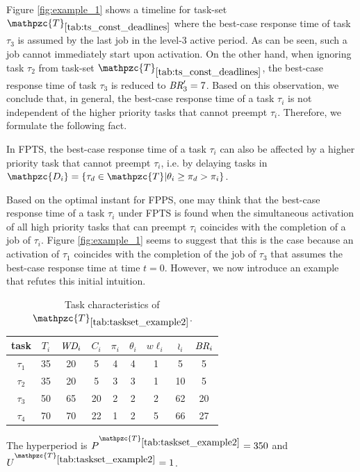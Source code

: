 Figure \ref{fig:example_1} shows a timeline for task-set $\mathpzc{T}_{\ref{tab:ts_const_deadlines}}$ where the best-case response time of task $\tau_3$ is assumed by the last job in the level-3 active period. As can be seen, such a job cannot immediately start upon activation. On the other hand, when ignoring task $\tau_2$ from task-set $\mathpzc{T}_{\ref{tab:ts_const_deadlines}}$, the best-case response time of task $\tau_3$ is reduced to $\mbox{\it BR}^{\prime}_3 = 7$. Based on this observation, we conclude that, in general, the best-case response time of a task $\tau_i$ is not independent of the higher priority tasks that cannot preempt $\tau_i$. Therefore, we formulate the following fact.

\begin{fact} \label{fct:delaying_tasks}
	In FPTS, the best-case response time of a task $\tau_i$ can also be affected by a higher priority task that cannot preempt $\tau_i$, i.e. by delaying tasks in $\mathpzc{D_i}=\{\tau_d \in \mathpzc{T}|\theta_i \geq \pi_d > \pi_i\}$.
\end{fact}


Based on the optimal instant for FPPS, one may think that the best-case response time of a task $\tau_i$ under FPTS is found when the simultaneous activation of all high priority tasks that can preempt $\tau_i$ coincides with the completion of a job of $\tau_i$. Figure \ref{fig:example_1} seems to suggest that this is the case because an activation of $\tau_1$ coincides with the completion of the job of $\tau_3$ that assumes the best-case response time at time $t=0$. However, we now introduce an example that refutes this initial intuition.

\begin{table}[h]
	\center
	\caption{Task characteristics of $\mathpzc{T}_{\ref{tab:taskset_example2}}$.}
	\label{tab:taskset_example2}
	\begin{tabular}{c | c c c c c | c c c}
		\hline 
		task & $T_i$ & $\mbox{\it WD}_i$ & $C_i$ & $\pi_i$ & $\theta_i$ & $w\ell_i$ & $\wr_i$ & $\mbox{\it BR}_i$\\ 
		\hline 
		$\tau_1$& 35 & 20 & 5  & 4 & 4 & 1 &5 & 5\\ 
		$\tau_2$& 35 & 20 & 5  & 3 & 3 & 1 &10 & 5\\
		$\tau_3$& 50 & 65 & 20 & 2 & 2 & 2 &62 & 20\\ 
		$\tau_4$& 70 & 70 & 22 & 1 & 2 & 5 &66 & 27\\
		\hline 
	\end{tabular}
	\small
	\item The hyperperiod is $P^{\mathpzc{T}_{\ref{tab:taskset_example2}}}=350$ and $U^{\mathpzc{T}_{\ref{tab:taskset_example2}}}=1$.
\end{table}

